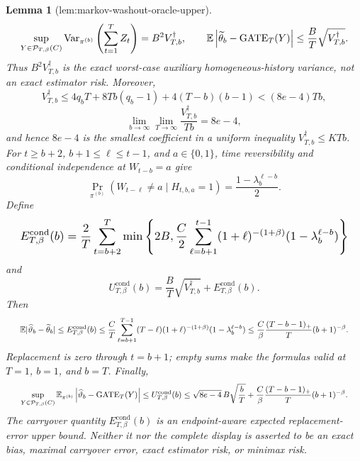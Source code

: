 \documentclass{article}
\newtheorem{lemma}{Lemma}
\begin{document}
\begin{lemma}[lem:markov-washout-oracle-upper]
\[\makebox[\linewidth][c]{\resizebox{0.98\linewidth}{!}{\leavevmode\par\noindent \makebox[\linewidth][c]{\resizebox{0.98\linewidth}{!}{\(\displaystyle \displaystyle \sup_{Y\in\mathcal P_{T,\beta}(C)}\operatorname{Var}_{\pi^{(b)}}\left(\sum_{t=1}^TZ_t\right)=B^2V_{T,b}^{\dagger},\qquad \mathbb E\left|\widetilde\theta_b-\operatorname{GATE}_T(Y)\right|\le\frac BT\sqrt{V_{T,b}^{\dagger}}.\)}}\par\noindent}}
\] Thus \(B^2V_{T,b}^{\dagger}\) is the exact worst-case auxiliary homogeneous-history variance, not an exact estimator risk. Moreover, \[V_{T,b}^{\dagger}\le4q_bT+8Tb(q_b-1)+4(T-b)(b-1)< (8e-4)Tb,\] \[\lim_{b\to\infty}\lim_{T\to\infty}\frac{V_{T,b}^{\dagger}}{Tb}=8e-4,\] and hence \(8e-4\) is the smallest coefficient in a uniform inequality \(V_{T,b}^{\dagger}\le KTb\). For \(t\ge b+2\), \(b+1\le\ell\le t-1\), and \(a\in\{0,1\}\), time reversibility and conditional independence at \(W_{t-b}=a\) give \[\Pr_{\pi^{(b)}}(W_{t-\ell}\ne a\mid H_{t,b,a}=1)=\frac{1-\lambda_b^{\ell-b}}2.\] Define \[
\makebox[\linewidth][c]{\resizebox{0.98\linewidth}{!}{\leavevmode\par\noindent \makebox[\linewidth][c]{\resizebox{0.98\linewidth}{!}{\(\displaystyle \displaystyle E_{T,\beta}^{\mathrm{cond}}(b)=\frac2T\sum_{t=b+2}^T\min\left\{2B,\frac C2\sum_{\ell=b+1}^{t-1}(1+\ell)^{-(1+\beta)}(1-\lambda_b^{\ell-b})\right\}\)}}\par\noindent}}
\] and \[U_{T,\beta}^{\mathrm{cond}}(b)=\frac BT\sqrt{V_{T,b}^{\dagger}}+E_{T,\beta}^{\mathrm{cond}}(b).\] Then \[
\makebox[\linewidth][c]{\resizebox{0.98\linewidth}{!}{\leavevmode\par\noindent \makebox[\linewidth][c]{\resizebox{0.98\linewidth}{!}{\(\displaystyle \displaystyle \mathbb E|\widehat\vartheta_b-\widetilde\theta_b|\le E_{T,\beta}^{\mathrm{cond}}(b)\le\frac CT\sum_{\ell=b+1}^{T-1}(T-\ell)(1+\ell)^{-(1+\beta)}(1-\lambda_b^{\ell-b})\le\frac C\beta\frac{(T-b-1)_+}{T}(b+1)^{-\beta}.\)}}\par\noindent}}
\] Replacement is zero through \(t=b+1\); empty sums make the formulas valid at \(T=1\), \(b=1\), and \(b=T\). Finally, \[
\makebox[\linewidth][c]{\resizebox{0.98\linewidth}{!}{\leavevmode\par\noindent \makebox[\linewidth][c]{\resizebox{0.98\linewidth}{!}{\(\displaystyle \displaystyle \sup_{Y\in\mathcal P_{T,\beta}(C)}\mathbb E_{\pi^{(b)}}\left|\widehat\vartheta_b-\operatorname{GATE}_T(Y)\right|\le U_{T,\beta}^{\mathrm{cond}}(b)\le\sqrt{8e-4}\,B\sqrt{\frac bT}+\frac C\beta\frac{(T-b-1)_+}{T}(b+1)^{-\beta}.\)}}\par\noindent}}
\] The carryover quantity \(E_{T,\beta}^{\mathrm{cond}}(b)\) is an endpoint-aware expected replacement-error upper bound. Neither it nor the complete display is asserted to be an exact bias, maximal carryover error, exact estimator risk, or minimax risk.
\end{lemma}
\end{document}
